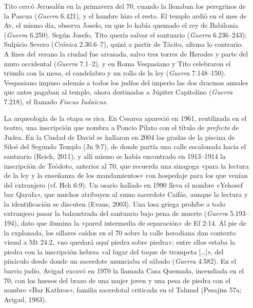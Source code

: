 \documentclass[11pt,letterpaper]{article}
\begin{document}
Tito cercó Jerusalén en la primavera del 70, cuando la llenaban los peregrinos de la Pascua (\emph{Guerra} 6.421), y el hambre hizo el resto. El templo ardió en el mes de Av, el mismo día, observa Josefo, en que lo había quemado el rey de Babilonia (\emph{Guerra} 6.250). Según Josefo, Tito quería salvar el santuario (\emph{Guerra} 6.236--243); Sulpicio Severo (\emph{Crónica} 2.30.6--7), quizá a partir de Tácito, afirma lo contrario. A fines del verano la ciudad fue arrasada, salvo tres torres de Herodes y parte del muro occidental (\emph{Guerra} 7.1--2), y en Roma Vespasiano y Tito celebraron el triunfo con la mesa, el candelabro y un rollo de la ley (\emph{Guerra} 7.148--150). Vespasiano impuso además a todos los judíos del imperio las dos dracmas anuales que antes pagaban al templo, ahora destinadas a Júpiter Capitolino (\emph{Guerra} 7.218), el llamado \emph{Fiscus Iudaicus}.

La arqueología de la etapa es rica. En Cesarea apareció en 1961, reutilizada en el teatro, una inscripción que nombra a Poncio Pilato con el título de \emph{prefecto} de Judea. En la Ciudad de David se hallaron en 2004 las gradas de la piscina de Siloé del Segundo Templo (Jn 9:7), de donde partía una calle escalonada hacia el santuario (Reich, 2011), y allí mismo se había encontrado en 1913--1914 la inscripción de Teódoto, anterior al 70, que recuerda una sinagoga «para la lectura de la ley y la enseñanza de los mandamientos» con hospedaje para los que venían del extranjero (cf. Hch 6:9). Un osario hallado en 1990 lleva el nombre «Yehosef bar Qayafa», que muchos atribuyen al sumo sacerdote Caifás, aunque la lectura y la identificación se discuten (Evans, 2003). Una losa griega prohíbe a todo extranjero pasar la balaustrada del santuario bajo pena de muerte (\emph{Guerra} 5.193--194), dato que ilumina la «pared intermedia de separación» de Ef 2:14. Al pie de la explanada, los sillares caídos en el 70 sobre la calle herodiana dan contexto visual a Mt 24:2, «no quedará aquí piedra sobre piedra»; entre ellos estaba la piedra con la inscripción hebrea «al lugar del toque de trompeta [\ldots]», del pináculo desde donde un sacerdote anunciaba el sábado (\emph{Guerra} 4.582). En el barrio judío, Avigad excavó en 1970 la llamada Casa Quemada, incendiada en el 70, con los huesos del brazo de una mujer joven y una pesa de piedra con el nombre «Bar Kathros», familia sacerdotal criticada en el Talmud (Pesajim 57a; Avigad, 1983).
\end{document}

